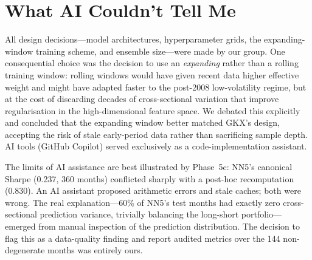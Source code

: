\documentclass[11pt,a4paper]{article}
\begin{document}
\section{What AI Couldn't Tell Me}

All design decisions---model architectures, hyperparameter grids, the expanding-window training scheme, and ensemble size---were made by our group. One consequential choice was the decision to use an \textit{expanding} rather than a rolling training window: rolling windows would have given recent data higher effective weight and might have adapted faster to the post-2008 low-volatility regime, but at the cost of discarding decades of cross-sectional variation that improve regularisation in the high-dimensional feature space. We debated this explicitly and concluded that the expanding window better matched GKX's design, accepting the risk of stale early-period data rather than sacrificing sample depth. AI tools (GitHub Copilot) served exclusively as a code-implementation assistant.

The limits of AI assistance are best illustrated by Phase~5c: NN5's canonical Sharpe (0.237, 360 months) conflicted sharply with a post-hoc recomputation (0.830). An AI assistant proposed arithmetic errors and stale caches; both were wrong. The real explanation---60\% of NN5's test months had exactly zero cross-sectional prediction variance, trivially balancing the long-short portfolio---emerged from manual inspection of the prediction distribution. The decision to flag this as a data-quality finding and report audited metrics over the 144 non-degenerate months was entirely ours.
\end{document}

